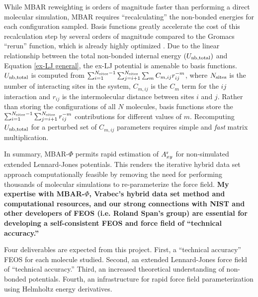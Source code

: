 \documentclass[12pt,a4paper]{article}
\begin{document}
While MBAR reweighting is orders of magnitude faster than performing a direct molecular simulation, MBAR requires ``recalculating'' the non-bonded energies for each configuration sampled. Basis functions greatly accelerate the cost of this recalculation step by several orders of magnitude compared to the Gromacs ``rerun'' function, which is already highly optimized \cite{GROMACS_2018}. Due to the linear relationship between the total non-bonded internal energy $(U_{\rm nb, total})$ and Equation \ref{ex-LJ general}, the ex-LJ potential is amenable to basis functions. $U_{\rm nb, total}$ is computed from $\sum_{i=1}^{N_{\rm sites}-1} \sum_{j=i+1}^{N_{\rm sites}} \sum_m C_{m,ij} r_{ij}^{-m}$, where $N_{\rm sites}$ is the number of interacting sites in the system, $C_{m,ij}$ is the $C_{m}$ term for the $ij$ interaction and $r_{ij}$ is the intermolecular distance between sites $i$ and $j$. Rather than storing the configurations of all $N$ molecules, basis functions store the $\sum_{i=1}^{N_{\rm sites}-1} \sum_{j=i+1}^{N_{\rm sites}} r_{ij}^{-m}$ contributions for different values of $m$. Recomputing $U_{\rm nb, total}$ for a perturbed set of $C_{m,ij}$ parameters requires simple and \textit{fast} matrix multiplication.

In summary, MBAR-$\Phi$ permits rapid estimation of $A_{xy}^{\rm r}$ for non-simulated extended Lennard-Jones potentials. This renders the iterative hybrid data set approach computationally feasible by removing the need for performing thousands of molecular simulations to re-parameterize the force field. \textbf{My expertise with MBAR-$\Phi$, Vrabec's hybrid data set method and computational resources, and our strong connections with NIST and other developers of FEOS (i.e. Roland Span's group) are essential for developing a self-consistent FEOS and force field of ``technical accuracy.''} 


Four deliverables are expected from this project. First, a ``technical accuracy'' FEOS for each molecule studied. Second, an extended Lennard-Jones force field of ``technical accuracy.'' Third, an increased theoretical understanding of non-bonded potentials. Fourth, an infrastructure for rapid force field parameterization using Helmholtz energy derivatives. 

\begin{spacing}{0.5}



\end{spacing}
\end{document}
